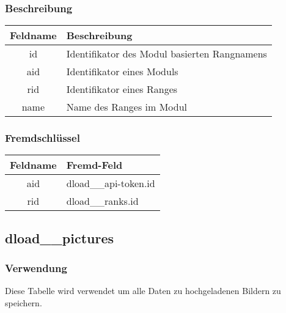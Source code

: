 \subsubsection{Beschreibung}
\begin{table}[H]
	\begin{tabular}{|c|p{12cm}|}
		\hline
		\textbf{Feldname} & \textbf{Beschreibung} \\ \hline
		id & Identifikator des Modul basierten Rangnamens \\ \hline
		aid & Identifikator eines Moduls \\ \hline
		rid & Identifikator eines Ranges \\ \hline
		name & Name des Ranges im Modul \\ \hline
	\end{tabular}
\end{table}
\subsubsection{Fremdschlüssel}
\begin{table}[H]
	\begin{tabular}{|c|p{12.5cm}|}
		\hline
		\textbf{Feldname} & \textbf{Fremd-Feld} \\ \hline
		aid & dload\_\_api-token.id \\ \hline
		rid & dload\_\_ranks.id \\ \hline
	\end{tabular}
\end{table}
\subsection{dload\_\_pictures}
\subsubsection{Verwendung} Diese Tabelle wird verwendet um alle Daten zu hochgeladenen Bildern zu speichern.
